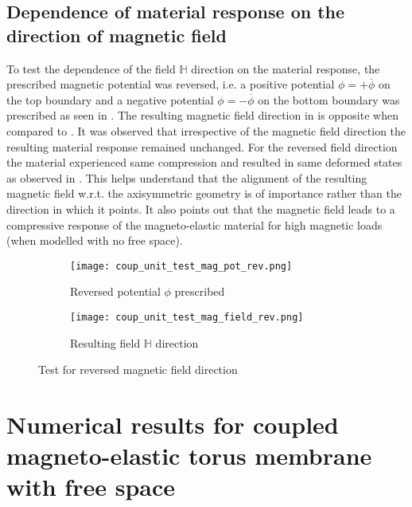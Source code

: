 \subsection{Dependence of material response on the direction of magnetic field}
To test the dependence of the field $\mathbb{H}$ direction on the material response, the prescribed magnetic potential was reversed, i.e. a positive potential $\phi = +\overline{\phi}$ on the top boundary and a negative potential $\phi = -\overline{\phi}$ on the bottom boundary was prescribed as seen in . The resulting magnetic field direction in  is opposite when compared to . It was observed that irrespective of the magnetic field direction the resulting material response remained unchanged. For the reversed field direction the material experienced same compression and resulted in same deformed states as observed in . This helps understand that the alignment of the resulting magnetic field w.r.t. the axisymmetric geometry is of importance rather than the direction in which it points. It also points out that the magnetic field leads to a compressive response of the magneto-elastic material for high magnetic loads (when modelled with no free space). \par 

\begin{figure}[h]
\centering
\begin{subfigure}{0.48\textwidth}
\centering
\texttt{[image: coup\_unit\_test\_mag\_pot\_rev.png]}
\caption{Reversed potential $\phi$ prescribed}
\label{fig:3.10.1}
\end{subfigure}
\begin{subfigure}{0.48\textwidth}
\centering
\texttt{[image: coup\_unit\_test\_mag\_field\_rev.png]}
\caption{Resulting field $\mathbb{H}$ direction}
\label{fig:3.10.2}
\end{subfigure}
\caption{Test for reversed magnetic field direction}
\label{fig:3.10}
\end{figure}

\section{Numerical results for coupled magneto-elastic torus membrane with free space}
\label{sec:torus_problem}

